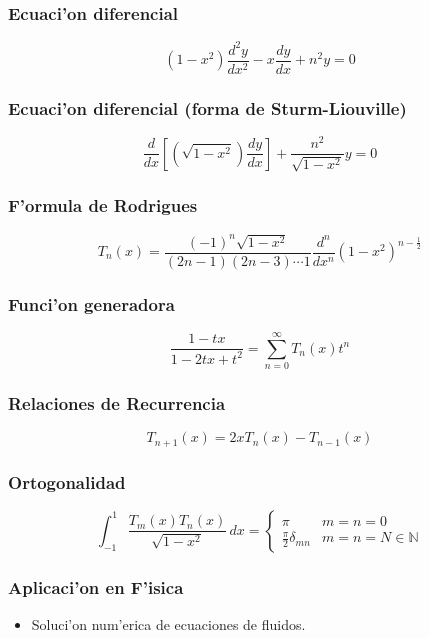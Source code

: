 \subsubsection{Ecuaci'on diferencial}

\begin{equation}
(1-x^{2})\frac{d^{2}y}{dx^{2}}-x\frac{dy}{dx}+n^{2}y=0
\end{equation}

\subsubsection{Ecuaci'on diferencial (forma de Sturm-Liouville)}

\begin{equation}
\frac{d}{dx}\left[\left(\sqrt{1-x^{2}} \right)\frac{dy}{dx}\right]+\frac{n^{2}}{\sqrt{1-x^{2}}}y=0
\end{equation}

\subsubsection{F'ormula de Rodrigues}

\begin{equation}
T_{n}(x)=\frac{(-1)^{n}\sqrt{1-x^{2}}}{(2n-1)(2n-3)\cdots 1} \frac{d^{n}}{dx^{n}}(1-x^{2})^{n-\frac{1}{2}}
\end{equation}

\subsubsection{Funci'on generadora}

\begin{equation}
\frac{1-tx}{1-2tx+t^{2}}=\sum_{n=0}^{\infty}T_{n}(x)t^{n}
\end{equation}

\subsubsection{Relaciones de Recurrencia}

\begin{equation}
T_{n+1}(x)=2xT_{n}(x)-T_{n-1}(x)
\end{equation}

\subsubsection{Ortogonalidad}

\begin{equation}
\int_{-1}^{1}\frac{T_{m}(x)T_{n}(x)}{\sqrt{1-x^{2}}}\,dx= \left\{\begin{array}{ll}\pi & m=n=0\\ \frac{\pi}{2}\delta_{mn} & m=n=N \in \mathbb{N} \end{array}\right.
\end{equation}

\subsubsection{Aplicaci'on en F'isica}
\begin{itemize}
\item Soluci'on num'erica de ecuaciones de fluidos.
\end{itemize}